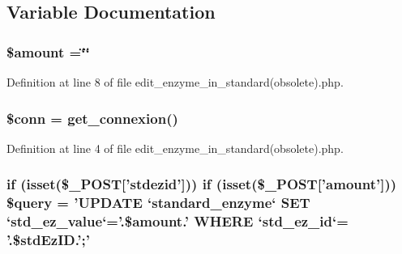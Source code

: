 \subsection{Variable Documentation}
\hypertarget{edit__enzyme__in__standard_07obsolete_08_8php_af48fe050f529b6ca56356299183b7778}{
\subsubsection[{\$amount}]{\setlength{\rightskip}{0pt plus 5cm}\$amount =\char`\"{}\char`\"{}}}\label{edit__enzyme__in__standard_07obsolete_08_8php_af48fe050f529b6ca56356299183b7778}


Definition at line 8 of file edit\-\_\-enzyme\-\_\-in\-\_\-standard(obsolete).\-php.

\hypertarget{edit__enzyme__in__standard_07obsolete_08_8php_aa8a5a87b9c1a6a0819b88447cbe41877}{
\subsubsection[{\$conn}]{\setlength{\rightskip}{0pt plus 5cm}\$conn = {\bf get\-\_\-connexion}()}}\label{edit__enzyme__in__standard_07obsolete_08_8php_aa8a5a87b9c1a6a0819b88447cbe41877}


Definition at line 4 of file edit\-\_\-enzyme\-\_\-in\-\_\-standard(obsolete).\-php.

\hypertarget{edit__enzyme__in__standard_07obsolete_08_8php_a94335fad7539f04bfbbd01ad794fa744}{
\subsubsection[{\$query}]{\setlength{\rightskip}{0pt plus 5cm}if (isset(\$\-\_\-\-P\-O\-S\-T\mbox{[}'stdezid'\mbox{]})) if (isset(\$\-\_\-\-P\-O\-S\-T\mbox{[}'amount'\mbox{]})) \$query = 'U\-P\-D\-A\-T\-E `standard\-\_\-enzyme` S\-E\-T `std\-\_\-ez\-\_\-value`='.\$amount.' W\-H\-E\-R\-E `std\-\_\-ez\-\_\-id`= '.\$std\-Ez\-I\-D.';'}}\label{edit__enzyme__in__standard_07obsolete_08_8php_a94335fad7539f04bfbbd01ad794fa744}


